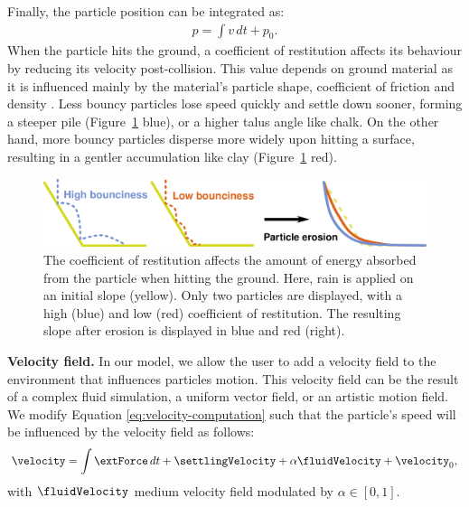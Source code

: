 Finally, the particle position can be integrated as: 
\begin{align} \nonumber
p = \int{ v \, dt} + p_0.
\end{align}
When the particle hits the ground, a coefficient of restitution affects its behaviour by reducing its velocity post-collision. This value depends on ground material as it is influenced mainly by the material's particle shape, coefficient of friction and density \cite{Yan2020}. Less bouncy particles lose speed quickly and settle down sooner, forming a steeper pile (Figure~\ref{Erosion-fig:coefficient of restitution-diagram} blue), or a higher talus angle like chalk. On the other hand, more bouncy particles disperse more widely upon hitting a surface, resulting in a gentler accumulation like clay (Figure~\ref{Erosion-fig:coefficient of restitution-diagram} red).
\begin{figure}
\centering
\includegraphics{figures/bounciness.pdf}
\caption{The coefficient of restitution affects the amount of energy absorbed from the particle when hitting the ground. Here, rain is applied on an initial slope (yellow). Only two particles are displayed, with a high (blue) and low (red) coefficient of restitution. The resulting slope after erosion is displayed in blue and red (right). }
\label{Erosion-fig:coefficient of restitution-diagram}

\end{figure}

\textbf{Velocity field.}
\label{sec:velocity_field_refinement}
In our model, we allow the user to add a velocity field to the environment that influences particles motion. This velocity field can be the result of a complex fluid simulation, a uniform vector field, or an artistic motion field.
We modify Equation \eqref{eq:velocity-computation} such that the particle's speed will be influenced by the velocity field as follows:
\begin{align} \label{eq:velocity-computation-final}
\velocity = \int{ \extForce \, dt} + \settlingVelocity + \alpha \fluidVelocity + \velocity_0,
\end{align}
with $\fluidVelocity$ medium velocity field modulated by $\alpha\in[0,1]$. 

